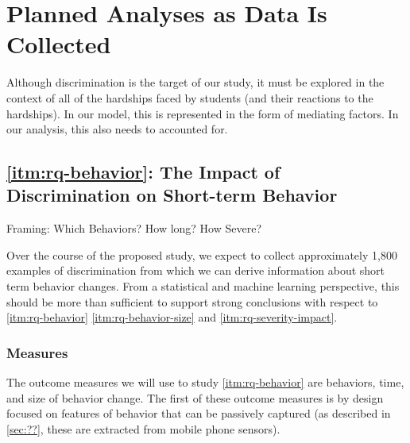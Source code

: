 
\section{Planned Analyses as Data Is Collected}

Although discrimination is the target of our study, it must be explored in the context of all of the hardships faced by students (and their reactions to the hardships). In our model, this is represented in the form of mediating factors. In our analysis, this also needs to accounted for.

\subsection{\ref{itm:rq-behavior}: The Impact of Discrimination on Short-term Behavior}

 Framing: Which Behaviors? How long? How Severe?
 
 Over the course of the proposed study, we expect to collect approximately 1,800 examples of discrimination from which we can derive information about short term behavior changes. From a statistical and machine learning perspective, this should be more than sufficient to support strong conclusions with respect to \ref{itm:rq-behavior} \ref{itm:rq-behavior-size} and \ref{itm:rq-severity-impact}.

\subsubsection{Measures} The outcome measures we will use to study \ref{itm:rq-behavior} are behaviors, time, and size of behavior change. The first of these outcome measures is by design focused on features of behavior that can be passively captured (as described in \ref{sec:??}, these are extracted from mobile phone sensors). 

